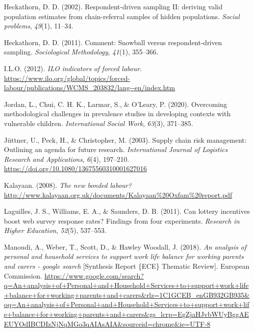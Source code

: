 \documentclass[
  12pt,
]{article}
\newlength{\cslhangindent}
\newenvironment{CSLReferences}[2] %
 {\begin{list}{}{%
  \setlength{\itemindent}{0pt}
  \setlength{\leftmargin}{0pt}
  \setlength{\parsep}{0pt}
  \ifodd #1
   \setlength{\leftmargin}{\cslhangindent}
   \setlength{\itemindent}{-1\cslhangindent}
  \fi
  \setlength{\itemsep}{#2\baselineskip}}}
 {\end{list}}
\theoremstyle{plain}
\theoremstyle{definition}
\begin{document}
\begin{CSLReferences}{1}{0}
Heckathorn, D. D. (2002). Respondent-driven sampling {II}: deriving
valid population estimates from chain-referral samples of hidden
populations. \emph{Social problems}, \emph{49}(1), 11--34.

Heckathorn, D. D. (2011). Comment: Snowball versus respondent-driven
sampling. \emph{Sociological Methodology}, \emph{41}(1), 355--366.

I.L.O. (2012). \emph{{ILO} indicators of forced labour}.
\url{https://www.ilo.org/global/topics/forced-labour/publications/WCMS_203832/lang--en/index.htm}

Jordan, L., Chui, C. H. K., Larmar, S., \& O'Leary, P. (2020).
Overcoming methodological challenges in prevalence studies in developing
contexts with vulnerable children. \emph{International Social Work},
\emph{63}(3), 371--385.

Jüttner, U., Peck, H., \& Christopher, M. (2003). Supply chain risk
management: Outlining an agenda for future research. \emph{International
Journal of Logistics Research and Applications}, \emph{6}(4), 197--210.
\url{https://doi.org/10.1080/13675560310001627016}

Kalayaan. (2008). \emph{The new bonded labour?}
\url{http://www.kalayaan.org.uk/documents/Kalayaan\%20Oxfam\%20report.pdf}

Laguilles, J. S., Williams, E. A., \& Saunders, D. B. (2011). Can
lottery incentives boost web survey response rates? Findings from four
experiments. \emph{Research in Higher Education}, \emph{52}(5),
537--553.

Manoudi, A., Weber, T., Scott, D., \& Hawley Woodall, J. (2018).
\emph{An analysis of personal and household services to support work
life balance for working parents and carers - google search}
{[}Synthesis Report \{ECE\} Thematic Review{]}. European Commission.
\url{https://www.google.com/search?q=An+analysis+of+Personal+and+Household+Services+to+support+work+life+balance+for+working+parents+and+carers&rlz=1C1GCEB_enGB932GB935&oq=An+analysis+of+Personal+and+Household+Services+to+support+work+life+balance+for+working+parents+and+carers&gs_lcrp=EgZjaHJvbWUyBggAEEUYOdIBCDIzNjNqMGo3qAIAsAIA&sourceid=chrome&ie=UTF-8}


\end{CSLReferences}
\end{document}
